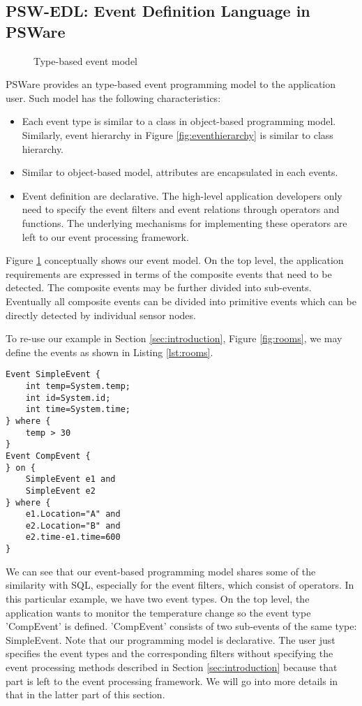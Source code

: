 \subsection{PSW-EDL: Event Definition Language in PSWare}
\begin{figure}
\centering
{}
\caption{Type-based event model}
\label{fig:eventprogramming}
\end{figure}

PSWare provides an type-based event programming model to the application user. Such model has the following characteristics:
\begin{itemize}
\item Each event type is similar to a class in object-based programming model. Similarly, event hierarchy in Figure \ref{fig:eventhierarchy} is similar to class hierarchy.
\item Similar to object-based model, attributes are encapsulated in each events.
\item Event definition are declarative. The high-level application developers only need to specify the event filters and event relations through operators and functions. The underlying mechanisms for implementing these operators are left to our event processing framework.
\end{itemize}

Figure \ref{fig:eventprogramming} conceptually shows our event model. On the top level, the application requirements are expressed in terms of the composite events that need to be detected. The composite events may be further divided into sub-events. Eventually all composite events can be divided into primitive events which can be directly detected by individual sensor nodes.

To re-use our example in Section \ref{sec:introduction}, Figure \ref{fig:rooms}, we may define the events as shown in Listing \ref{lst:rooms}.
\begin{lstlisting}[caption=Example of using even-based programming model, label=lst:rooms]
Event SimpleEvent {
	int temp=System.temp;
	int id=System.id;
	int time=System.time;
} where {
	temp > 30
}
Event CompEvent {
} on {
	SimpleEvent e1 and
	SimpleEvent e2
} where {
	e1.Location="A" and
	e2.Location="B" and
	e2.time-e1.time=600
}
\end{lstlisting}

We can see that our event-based programming model shares some of the similarity with SQL, especially for the event filters, which consist of operators. In this particular example, we have two event types. On the top level, the application wants to monitor the temperature change so the event type 'CompEvent' is defined. 'CompEvent' consists of two sub-events of the same type: SimpleEvent. Note that our programming model is declarative. The user just specifies the event types and the corresponding filters without specifying the event processing methods described in Section \ref{sec:introduction} because that part is left to the event processing framework. We will go into more details in that in the latter part of this section.

